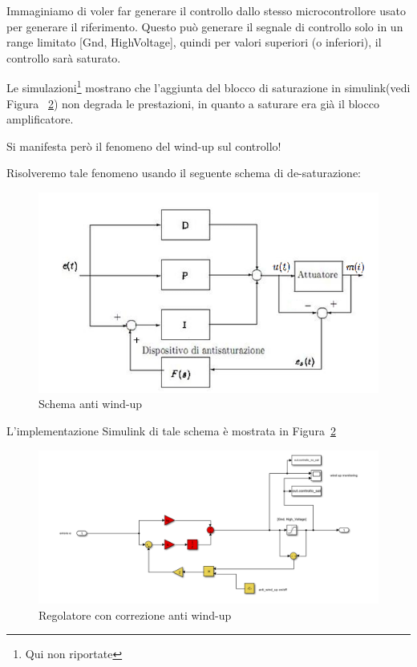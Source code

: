 \documentclass[a4paper,12pt]{article}
\begin{document}
Immaginiamo di voler far generare il controllo dallo stesso microcontrollore usato per generare il riferimento.
Questo può generare il segnale di controllo solo in un range limitato [Gnd, HighVoltage], quindi per valori superiori (o inferiori), il controllo sarà saturato.

Le simulazioni\footnote{Qui non riportate} mostrano che l'aggiunta del blocco di saturazione in simulink(vedi Figura ~\ref{fig: regolatoreAntiWU})  non degrada le prestazioni, in quanto a saturare era già il blocco amplificatore.

Si manifesta però il fenomeno del wind-up sul controllo!

\vspace{0.5cm}

Risolveremo tale fenomeno usando il seguente schema di de-saturazione:
\begin{figure}[h!]
    \centering
    \includegraphics[scale=0.7]{Immagini/Altre/antiwindupSchema.PNG}
    \caption{Schema anti wind-up}
    \label{fig:antiWindup}
\end{figure}

\vspace{0.5cm}

L'implementazione Simulink di tale schema è mostrata in Figura~\ref{fig: regolatoreAntiWU}

\begin{figure}[h!]
    \centering
    \includegraphics[scale = 0.6]{Immagini/Altre/regolatoreDesaturatoSimulink.PNG}
    \caption{Regolatore con correzione anti wind-up}
    \label{fig: regolatoreAntiWU}
\end{figure}
\end{document}
